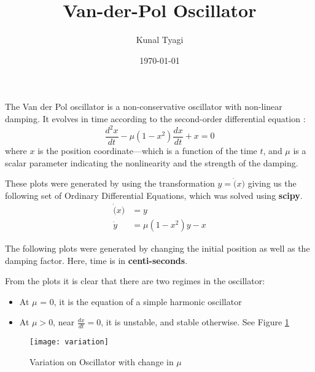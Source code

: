 \documentclass[12pt, a4paper]{article}
\title{Van-der-Pol Oscillator}
\author{Kunal Tyagi}
\date{\today}
\begin{document}
\maketitle
The Van der Pol oscillator is a non-conservative oscillator with
non-linear damping.  It evolves in time according to the second-order
differential equation \cite{wiki, slides}:
\begin{equation}
    \frac{d^2x}{dt} - \mu (1 - x^2)\frac{dx}{dt} + x = 0
\end{equation}
where $x$ is the position coordinate—which is a function of the time $t$, and
$\mu$ is a scalar parameter indicating the nonlinearity and the strength of
the damping.

These plots were generated by using the transformation $y = \dot(x)$
giving us the following set of Ordinary Differential Equations, which
was solved using \textbf{scipy}.
\begin{align}
    \dot(x) &= y\\
    \dot{y} &= \mu(1- x^2)y - x
\end{align}

The following plots were generated by changing the initial position as
well as the damping factor. Here, time is in \textbf{centi-seconds}.



From the plots it is clear that there are two regimes in the oscillator:
\begin{itemize}
        \item At $\mu$ = 0, it is the equation of a simple harmonic
            oscillator
        \item At $\mu > $0, near $\frac{dx}{dt} = 0$, it is unstable, and
            stable otherwise. See Figure \ref{fig:variation}
\end{itemize}

\begin{figure}[ht]
    \centering
    \texttt{[image: variation]}
    \caption{Variation on Oscillator with change in $\mu$}
    \label{fig:variation}
\end{figure}

{}
\end{document}
